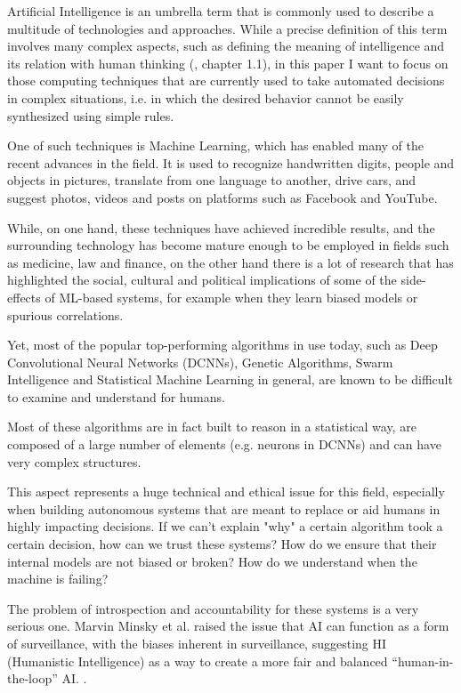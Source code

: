 \documentclass[conference]{IEEEtran}
\begin{document}
Artificial Intelligence is an umbrella term that is commonly used to describe a
multitude of technologies and approaches. While a precise definition of this
term involves many complex aspects, such as defining the meaning of intelligence
and its relation with human thinking (\citet{Norvig}, chapter 1.1), in this
paper I want to focus on those computing techniques that are currently used to
take automated decisions in complex situations, i.e. in which the desired
behavior cannot be easily synthesized using simple rules.

One of such techniques is Machine Learning, which has enabled many of the recent
advances in the field. It is used to recognize handwritten digits, people and
objects in pictures, translate from one language to another, drive cars, and
suggest photos, videos and posts on platforms such as Facebook and YouTube.

While, on one hand, these techniques have achieved incredible results, and the
surrounding technology has become mature enough to be employed in fields such as
medicine, law and finance, on the other hand there is a lot of research that has
highlighted the social, cultural and political implications of some of the
side-effects of ML-based systems, for example when they learn biased models or
spurious correlations.

Yet, most of the popular top-performing algorithms in use today, such as Deep
Convolutional Neural Networks (DCNNs), Genetic Algorithms, Swarm Intelligence
and Statistical Machine Learning in general, are known to be difficult to
examine and understand for humans.

Most of these algorithms are in fact built to reason in a statistical way, are
composed of a large number of elements (e.g. neurons in DCNNs) and can have very
complex structures.

This aspect represents a huge technical and ethical issue for this field,
especially when building autonomous systems that are meant to replace or aid
humans in highly impacting decisions. If we can't explain "why" a certain
algorithm took a certain decision, how can we trust these systems? How do we
ensure that their internal models are not biased or broken? How do we understand
when the machine is failing?

The problem of introspection and accountability for these systems is a very
serious one. Marvin Minsky et al. raised the issue that AI can function as a
form of surveillance, with the biases inherent in surveillance, suggesting HI
(Humanistic Intelligence) as a way to create a more fair and balanced
``human-in-the-loop'' AI. \citet{minsky}.
\end{document}
